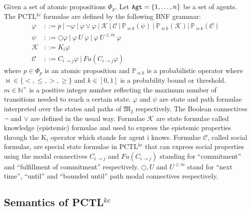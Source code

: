 \begin{definition}[Syntax]\label{def:PCTLKC syntax}
Given a set of atomic propositions $\Phi_p$. Let $\verb"Agt"=\{1, \dots, n\}$ be a set of agents. The PCTL$^{kc}$ formulae are defined by the following BNF grammar:
%
\begin{align*}
    \varphi & ::= p~|~\neg \varphi~|~\varphi \vee \varphi~|~\mathcal{K}~|~\mathcal{C}~|~ \mathbb{P}_{\bowtie k} (\psi)~|~\mathbb{P}_{\bowtie k}(\mathcal{K})|~\mathbb{P}_{\bowtie k}(\mathcal{C})\\
    \psi & ::=\bigcirc \varphi ~ | ~ \varphi ~U~ \varphi~|~ \varphi~ U^{\leq m} ~ \varphi \\
    \mathcal{K} & ::= K_i \varphi \\
    \mathcal{C} & ::= C_{i\rightarrow j}\varphi ~| ~ Fu(C_{i\rightarrow j}\varphi)
\end{align*}
%
where $p\in\Phi_p$ is an atomic proposition and $\mathbb{P}_{\bowtie
k}$ is a probabilistic operator where $\bowtie \in\{<,\leq,>,\ge\}$ and $k\in [0,1]$ is a probability bound or threshold. $m \in\mathbb{N}^+ $ is a positive integer number reflecting the maximum number of transitions needed to reach a certain state. $\varphi$ and $\psi$ are state and path formulae interpreted over the states and paths of $\mathfrak{M_2}$ respectively. The Boolean connectives $\neg$ and $\vee$ are defined in the usual
way. Formulae $\mathcal{K}$ are state formulae called knowledge (epistemic) formulae and used to express the epistemic properties through the K$_i$ operator which stands for agent i knows. Formulae $\mathcal{C}$, called social formulae, are special state formulae in PCTL$^{kc}$ that can express social properties using the modal connectives $C_{i\rightarrow j}$ and $Fu(C_{i\rightarrow j})$ standing for ``commitment'' and ``fulfillment of commitment'' respectively. $\bigcirc, U$ and $U^{\leq m}$ stand for ``next time'', ``until'' and ``bounded until'' path modal connectives
respectively.

\end{definition}



\subsection{Semantics of PCTL$^{kc}$} \label{def:semantics-PCTLKC}

